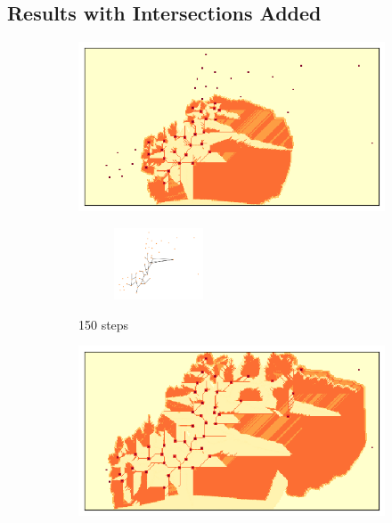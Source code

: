 \documentclass[11pt]{article}
\begin{document}
\subsection{Results with Intersections Added}
\begin{figure}[H]
    \centering
    \begin{subfigure}{0.24\textwidth}
        \centering
        \includegraphics[width=\linewidth]{150.png}
	\begin{subfigure}{0.24\textwidth}
	    \centering
	    \hspace*{-1cm}
	    \includegraphics[width=100px]{150g.png}
	\end{subfigure}
        \caption{150 steps}
    \end{subfigure}\hfill
    \begin{subfigure}{0.24\textwidth}
        \centering
        \includegraphics[width=\linewidth]{250.png}
	\begin{subfigure}{0.24\textwidth}

\end{subfigure}
\end{subfigure}
\end{figure}
\end{document}
